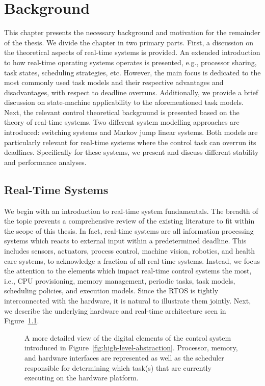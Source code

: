 \chapter{Background}%
\label{ch:background}%

This chapter presents the necessary background and motivation for the remainder of the thesis.
We divide the chapter in two primary parts.
First, a discussion on the theoretical aspects of real-time systems is provided.
An extended introduction to how real-time operating systems operates is presented, e.g., processor sharing, task states, scheduling strategies, etc.
However, the main focus is dedicated to the most commonly used task models and their respective advantages and disadvantages, with respect to deadline overruns.
Additionally, we provide a brief discussion on state-machine applicability to the aforementioned task models. 
Next, the relevant control theoretical background is presented based on the theory of real-time systems.
Two different system modelling approaches are introduced: switching systems and Markov jump linear systems.
Both models are particularly relevant for real-time systems where the control task can overrun its deadlines.
Specifically for these systems, we present and discuss different stability and performance analyses.

\section{Real-Time Systems}%
\label{sec:background:rts}%
%
We begin with an introduction to real-time system fundamentals. 
The breadth of the topic prevents a comprehensive review of the existing literature to fit within the scope of this thesis.
In fact, real-time systems are all information processing systems which reacts to external input within a predetermined deadline. 
This includes sensors, actuators, process control, machine vision, robotics, and health care systems, to acknowledge a fraction of all real-time systems.
Instead, we focus the attention to the elements which impact real-time control systems the most, i.e., CPU provisioning, memory management, periodic tasks, task models, scheduling policies, and execution models.
Since the RTOS is tightly interconnected with the hardware, it is natural to illustrate them jointly.
Next, we describe the underlying hardware and real-time architecture seen in Figure~\ref{fig:operating-system-abstraction}.
%
\begin{figure}[t]
    \centering
    \caption{A more detailed view of the digital elements of the control system introduced in Figure~\ref{fig:high-level-abstraction}. Processor, memory, and hardware interfaces are represented as well as the scheduler responsible for determining which task(s) that are currently executing on the hardware platform.}%
    \label{fig:operating-system-abstraction}%
\end{figure}

